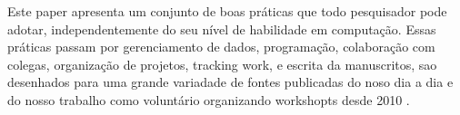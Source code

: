 





Este paper
apresenta um conjunto de boas práticas que todo pesquisador pode adotar,
independentemente do seu nível de habilidade em computação. Essas práticas
passam por gerenciamento de dados, programação, colaboração com colegas,
organização de projetos, tracking work, e escrita da manuscritos, sao
desenhados para uma grande variadade de fontes publicadas do noso dia a dia e
do nosso trabalho como voluntário organizando workshopts desde 2010
\cite{wilson2017good}.

